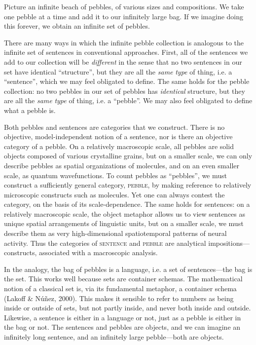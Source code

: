 Picture an infinite beach of pebbles, of various sizes and compositions. We take one pebble at a time and add it to our infinitely large bag. If we imagine doing this forever, we obtain an infinite set of pebbles. 

  There are many ways in which the infinite pebble collection is analogous to the infinite set of sentences in conventional approaches. First, all of the sentences we add to our collection will be \textit{different} in the sense that no two sentences in our set have identical “structure”, but they are all the \textit{same} \textit{type} of thing, i.e. a “sentence”, which we may feel obligated to define. The same holds for the pebble collection: no two pebbles in our set of pebbles has \textit{identical} structure, but they are all the \textit{same} \textit{type} of thing, i.e. a “pebble”. We may also feel obligated to define what a pebble is.

  Both pebbles and sentences are categories that we construct. There is no objective, model-independent notion of a sentence, nor is there an objective category of a pebble. On a relatively macroscopic scale, all pebbles are solid objects composed of various crystalline grains, but on a smaller scale, we can only describe pebbles as spatial organizations of molecules, and on an even smaller scale, as quantum wavefunctions. To count pebbles as “pebbles”, we must construct a sufficiently general category, \textsc{pebble}, by making reference to relatively microscopic constructs such as molecules. Yet one can always contest the category, on the basis of its scale-dependence. The same holds for sentences: on a relatively macroscopic scale, the object metaphor allows us to view sentences as unique spatial arrangements of linguistic units, but on a smaller scale, we must describe them as very high-dimensional spatiotemporal patterns of neural activity. Thus the categories of \textsc{sentence} and \textsc{pebble} are analytical impositions—constructs, associated with a macroscopic analysis. 

  In the analogy, the bag of pebbles is a language, i.e. a set of sentences—the bag is the set. This works well because sets are container schemas. The mathematical notion of a classical set is, via its fundamental metaphor, a container schema (Lakoff \& Núñez, 2000). This makes it sensible to refer to numbers as being inside or outside of sets, but not partly inside, and never both inside and outside. Likewise, a sentence is either in a language or not, just as a pebble is either in the bag or not. The sentences and pebbles are objects, and we can imagine an infinitely long sentence, and an infinitely large pebble—both are objects. 


